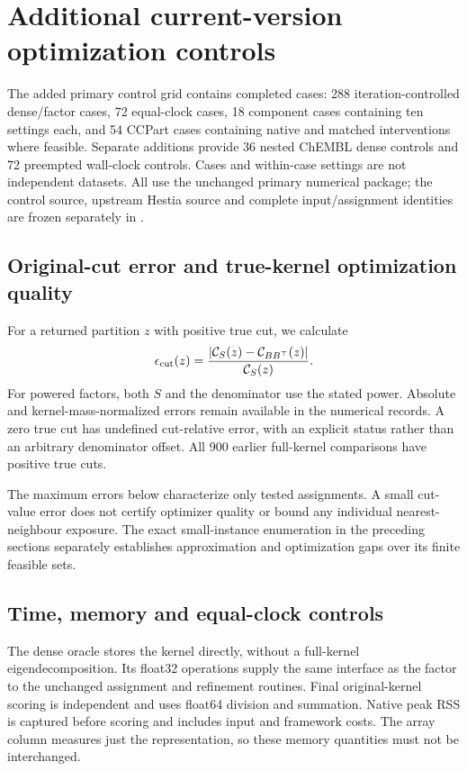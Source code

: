 \section{Additional current-version optimization controls}

The added primary control grid contains \ControlsCases{} completed cases: 288
iteration-controlled dense/factor cases, 72 equal-clock cases, 18 component
cases containing ten settings each, and 54 CCPart cases containing native
and matched interventions where feasible. Separate additions provide 36 nested
ChEMBL dense controls and 72 preempted wall-clock controls. Cases and within-case settings are
not independent datasets. All use the unchanged primary numerical package;
the control source, upstream Hestia source and complete input/assignment
identities are frozen separately in .

\subsection{Original-cut error and true-kernel optimization quality}

For a returned partition $z$ with positive true cut, we calculate
\[
 \epsilon_{\mathrm{cut}}(z)=
 \frac{|\mathcal{C}_S(z)-\mathcal{C}_{BB^\top}(z)|}{\mathcal{C}_S(z)}.
\]
For powered factors, both $S$ and the denominator use the stated power.
Absolute and kernel-mass-normalized errors remain available in the numerical
records. A zero true cut has undefined cut-relative error, with an explicit
status rather than an arbitrary denominator offset. All 900 earlier
full-kernel comparisons have positive true cuts.

The maximum errors below characterize only tested assignments. A small
cut-value error does not certify optimizer quality or bound any individual
nearest-neighbour exposure. The exact small-instance enumeration in the
preceding sections separately establishes approximation and optimization
gaps over its finite feasible sets.






\subsection{Time, memory and equal-clock controls}

The dense oracle stores the kernel directly, without a full-kernel
eigendecomposition. Its float32 operations supply the same interface as the
factor to the unchanged assignment and refinement routines. Final original-kernel
scoring is independent and uses float64 division and summation. Native peak
RSS is captured before scoring and includes input and framework costs. The
array column measures just the representation, so these memory quantities
must not be interchanged.

